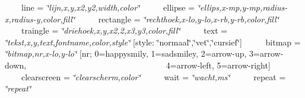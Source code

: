 ~~~~line = {\itshape \char`\"{}lijn,x,y,x2,y2,width,color\char`\"{}}~\newline
 ~~~~ellipse = {\itshape \char`\"{}ellips,x-\/mp,y-\/mp,radius-\/x,radius-\/y,color,fill\char`\"{}}~\newline
 ~~~~rectangle = {\itshape \char`\"{}rechthoek,x-\/lo,y-\/lo,x-\/rb,y-\/rb,color,fill\char`\"{}}~\newline
 ~~~~traingle = {\itshape \char`\"{}driehoek,x,y,x2,2,x3,y3,color,fill\char`\"{}}~\newline
 ~~~~text = {\itshape \char`\"{}tekst,x,y,text,fontname,color,style\char`\"{}} \mbox{[}style\+: \char`\"{}normaal\char`\"{},\char`\"{}vet\char`\"{},\char`\"{}cursief\char`\"{}\mbox{]}~\newline
 ~~~~bitmap = {\itshape \char`\"{}bitmap,nr,x-\/lo,y-\/lo\char`\"{}} \mbox{[}nr; 0=happysmily, 1=sadsmiley, 2=arrow-\/up, 3=arrow-\/down,~\newline
 ~~~~~~~~~~~~~~~~~~~~~~~~~~~~~~~~4=arrow-\/left, 5=arrow-\/right\mbox{]}~\newline
 ~~~~clearscreen = {\itshape \char`\"{}clearscherm,color\char`\"{}}~\newline
 ~~~~wait = {\itshape \char`\"{}wacht,ms\char`\"{}}~\newline
 ~~~~repeat = {\itshape \char`\"{}repeat\char`\"{}}~\newline


